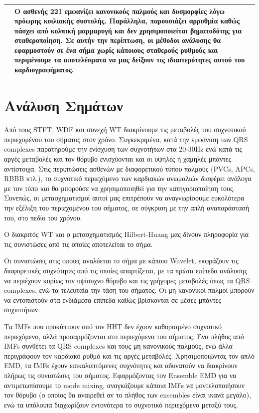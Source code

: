\documentclass[11pt,a4paper]{article}
\begin{document}
\begin{center}
\begin{tabular}{| >{\centering\arraybackslash}m{1cm} | >{\centering\arraybackslash}m{15cm}|}
 \hline
 221 & Ο ασθενής 221 εμφανίζει κανονικούς παλμούς και δυσμορφίες λόγω πρόωρης κοιλιακής συστολής. Παράλληλα, παρουσιάζει αρρυθμία καθώς πάσχει από κολπική μαρμαρυγή και δεν χρησιμοποιείται βηματοδότης για σταθεροποίηση. Σε αυτήν την περίπτωση, οι μέθοδοι ανάλυσης θα εφαρμοστούν σε ένα σήμα χωρίς κάποιους σταθερούς ρυθμούς και περιμένουμε τα αποτελέσματα να μας δείξουν τις ιδιαιτερότητες αυτού του καρδιογραφήματος. \\ 
 \hline
\end{tabular}
\end{center}


\section*{Ανάλυση Σημάτων}

Από τους STFT, WDF και συνεχή WT διακρίνουμε τις μεταβολές του συχνοτικού περιεχομένου του σήματος στον χρόνο. Συγκεκριμένα, κατά την εμφάνιση των QRS complexes παρατηρούμε την ενίσχυση των συχνοτήτων στα 20-30Hz ενώ κατά τις αργές μεταβολές και τον θόρυβο ενισχύονται και οι υψηλές ή χαμηλές μπάντες αντίστοιχα. Στις περιπτώσεις ασθενών με διαφορετικού τύπου παλμούς (PVCs, APCs, RBBB κτλ.), το συχνοτικό περιεχόμενο των καρδιακών ανωμαλιών διαφέρει ανάλογα με τον τύπο και θα μπορούσε να χρησιμοποιηθεί για την κατηγοριοποίηση τους. Συνεπώς, οι μετασχηματισμοί αυτοί μας επιτρέπουν να αναγνωρίσουμε ευκολότερα την εξέλιξη του περιεχομένου του σήματος, σε σύγκριση με την απλή αναπαράστασή του, στο πεδίο του χρόνου.

Ο διακριτός WT και ο μετασχηματισμός Hilbert-Huang μας δίνουν πληροφορία για τις συνιστώσες από τις οποίες αποτελείται το σήμα. 

Οι συνιστώσες στις οποίες αναλύεται το σήμα με κάποιο Wavelet, εκφράζουν τις διαφορετικές συχνότητες από τις οποίες απαρτίζεται, με τα πρώτα επίπεδα ανάλυσης να περιέχουν κυρίως τον υψίσυχνο θόρυβο και τις γρήγορες μεταβολές όπως τα QRS complexes, ενώ τα τελευταία την τάση του σήματος. Οι μη-κανονικοί παλμοί μπορούν να εντοπιστούν στα ενδιάμεσα επίπεδα καθώς βρίσκονται σε μέσες μπάντες συχνοτήτων.

Τα IMFs που προκύπτουν από τον HHT δεν έχουν καθορισμένο συχνοτικό περιεχόμενο, αλλά προσαρμόζονται στο περιεχόμενο του σήματος. Ένα πλήθος από IMFs συνθέτει τα QRS complexes και τους μη κανονικούς παλμούς, ενώ άλλα περιγράφουν τον καρδιακό ρυθμό και τις αργές μεταβολές. Χρησιμοποιώντας τον απλό EMD, τα IMFs έχουν επικαλυπτόμενες συχνότητες και αδυνατούν να διακρίνουν πλήρως τις συνιστώσες του σήματος. Εφαρμόζοντας τον Ensemble EMD για να αντιμετωπίσουμε το mode mixing, αναγκάζουμε κάποια IMFs να μοντελοποιήσουν τον θόρυβο (ο οποίος θα αναιρεθεί αν το πλήθος των ensembles είναι ικανά μεγάλο), ενώ τα υπόλοιπα διαχωρίζουν εντονότερα το συχνοτικό περιεχόμενο μεταξύ τους.
\end{document}
